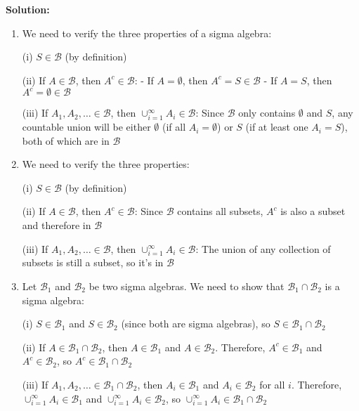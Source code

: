 \noindent\textbf{Solution:}
\begin{enumerate}[label=(\alph*)]
    \item We need to verify the three properties of a sigma algebra:
    
    (i) $S \in \mathcal{B}$ (by definition)
    
    (ii) If $A \in \mathcal{B}$, then $A^c \in \mathcal{B}$:
    - If $A = \emptyset$, then $A^c = S \in \mathcal{B}$
    - If $A = S$, then $A^c = \emptyset \in \mathcal{B}$
    
    (iii) If $A_1, A_2, \ldots \in \mathcal{B}$, then $\cup_{i=1}^{\infty} A_i \in \mathcal{B}$:
    Since $\mathcal{B}$ only contains $\emptyset$ and $S$, any countable union will be either $\emptyset$ (if all $A_i = \emptyset$) or $S$ (if at least one $A_i = S$), both of which are in $\mathcal{B}$
    
    \item We need to verify the three properties:
    
    (i) $S \in \mathcal{B}$ (by definition)
    
    (ii) If $A \in \mathcal{B}$, then $A^c \in \mathcal{B}$:
    Since $\mathcal{B}$ contains all subsets, $A^c$ is also a subset and therefore in $\mathcal{B}$
    
    (iii) If $A_1, A_2, \ldots \in \mathcal{B}$, then $\cup_{i=1}^{\infty} A_i \in \mathcal{B}$:
    The union of any collection of subsets is still a subset, so it's in $\mathcal{B}$
    
    \item Let $\mathcal{B}_1$ and $\mathcal{B}_2$ be two sigma algebras. We need to show that $\mathcal{B}_1 \cap \mathcal{B}_2$ is a sigma algebra:
    
    (i) $S \in \mathcal{B}_1$ and $S \in \mathcal{B}_2$ (since both are sigma algebras), so $S \in \mathcal{B}_1 \cap \mathcal{B}_2$
    
    (ii) If $A \in \mathcal{B}_1 \cap \mathcal{B}_2$, then $A \in \mathcal{B}_1$ and $A \in \mathcal{B}_2$. Therefore, $A^c \in \mathcal{B}_1$ and $A^c \in \mathcal{B}_2$, so $A^c \in \mathcal{B}_1 \cap \mathcal{B}_2$
    
    (iii) If $A_1, A_2, \ldots \in \mathcal{B}_1 \cap \mathcal{B}_2$, then $A_i \in \mathcal{B}_1$ and $A_i \in \mathcal{B}_2$ for all $i$. Therefore, $\cup_{i=1}^{\infty} A_i \in \mathcal{B}_1$ and $\cup_{i=1}^{\infty} A_i \in \mathcal{B}_2$, so $\cup_{i=1}^{\infty} A_i \in \mathcal{B}_1 \cap \mathcal{B}_2$
\end{enumerate}



